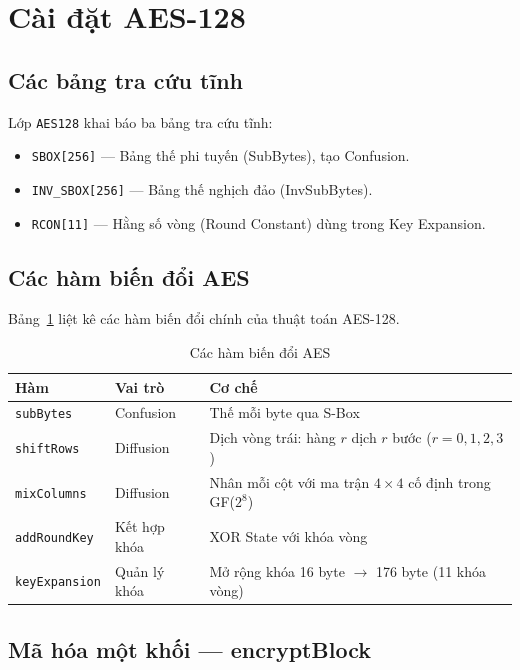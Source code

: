 \section{Cài đặt AES-128}
\label{sec:impl-aes}

\subsection{Các bảng tra cứu tĩnh}

Lớp \texttt{AES128} khai báo ba bảng tra cứu tĩnh:
\begin{itemize}
    \item \texttt{SBOX[256]} --- Bảng thế phi tuyến (SubBytes), tạo Confusion.
    \item \texttt{INV\_SBOX[256]} --- Bảng thế nghịch đảo (InvSubBytes).
    \item \texttt{RCON[11]} --- Hằng số vòng (Round Constant) dùng trong Key Expansion.
\end{itemize}

\subsection{Các hàm biến đổi AES}

Bảng~\ref{tab:aes-funcs} liệt kê các hàm biến đổi chính của thuật toán AES-128.

\begin{table}[htbp]
\centering
\caption{Các hàm biến đổi AES}
\label{tab:aes-funcs}
\begin{tabular}{@{}p{2.8cm}p{2.5cm}p{8cm}@{}}
\toprule
\textbf{Hàm} & \textbf{Vai trò} & \textbf{Cơ chế} \\
\midrule
\texttt{subBytes}     & Confusion  & Thế mỗi byte qua S-Box \\
\texttt{shiftRows}    & Diffusion  & Dịch vòng trái: hàng $r$ dịch $r$ bước ($r=0,1,2,3$) \\
\texttt{mixColumns}   & Diffusion  & Nhân mỗi cột với ma trận $4\times4$ cố định trong GF($2^8$) \\
\texttt{addRoundKey}  & Kết hợp khóa & XOR State với khóa vòng \\
\texttt{keyExpansion} & Quản lý khóa & Mở rộng khóa 16 byte $\rightarrow$ 176 byte (11 khóa vòng) \\
\bottomrule
\end{tabular}
\end{table}

\subsection{Mã hóa một khối --- encryptBlock}

